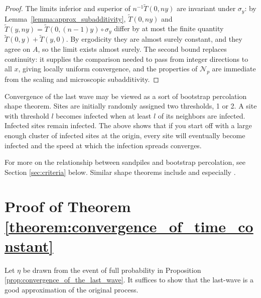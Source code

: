 \documentclass[12pt]{amsart}
\begin{document}
\begin{proof}
	The limits inferior and superior of $n^{-1}\tilde{T}(0,ny)$ are invariant under $\sigma_y$: by Lemma~\ref{lemma:approx_subadditivity}, $\tilde{T}(0,ny)$ and $\tilde{T}(y,ny)=\tilde{T}(0,(n-1)y)\circ\sigma_y$ differ by at most the finite quantity $\tilde{T}(0,y)+\tilde{T}(y,0)$. By ergodicity they are almost surely constant, and they agree on $A$, so the limit exists almost surely. The second bound replaces continuity: it supplies the comparison needed to pass from integer directions to all $x$, giving locally uniform convergence, and the properties of $\mathcal{N}_p$ are immediate from the scaling and microscopic subadditivity.
\end{proof}

\begin{remark}
	Convergence of the last wave may be viewed as a sort of bootstrap percolation shape theorem. 
	Sites are initially randomly assigned two thresholds, 1 or 2. A site with threshold $l$
	becomes infected when at least $l$ of its neighbors are infected. Infected sites remain infected. 
	The above shows that if you start off with a large enough cluster of infected sites at the origin, every site will eventually become 
	infected and the speed at which the infection spreads converges. 
	
	For more on the relationship between sandpiles and bootstrap percolation, see Section \ref{sec:criteria} below. 
	Similar shape theorems include \cite{garet2012asymptotic, kesten2008shape,alves2002shape, cox1981some} and 
	especially \cite{willson1978convergence, gravner1993threshold,fey2010limiting}.
\end{remark}




\section{Proof of Theorem \ref{theorem:convergence_of_time_constant}} \label{sec:proof_of_theorem}
Let $\eta$ be drawn from the event of full probability in Proposition \ref{prop:convergence_of_the_last_wave}.
It suffices to show that the last-wave is a good approximation of the original process. 
\end{document}
